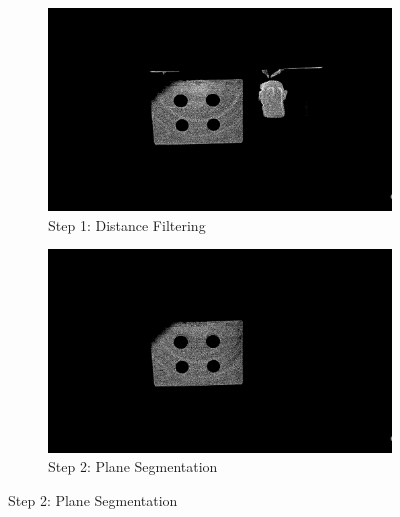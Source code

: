 \documentclass[english, bachelor, utf8]{base/thesis_telematics}
\begin{document}
\begin{figure}[htbp]
    \centering
    \begin{subfigure}[b]{0.45\textwidth}
        \centering
        \includegraphics[width=\linewidth]{pics/calib_pics/filter.png}
        \caption{Step 1: Distance Filtering}
    \end{subfigure}
    \hfill
    \begin{subfigure}[b]{0.45\textwidth}
        \centering
        \includegraphics[width=\linewidth]{pics/calib_pics/plane.png}
        \caption{Step 2: Plane Segmentation}
    \end{subfigure}


\end{figure}
\end{document}
